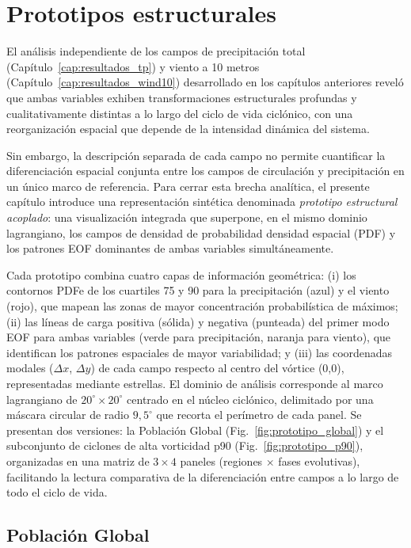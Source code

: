 \chapter{Prototipos estructurales}\label{cap:prototipos}


El análisis independiente de los campos de precipitación total (Capítulo~\ref{cap:resultados_tp}) y viento a 10 metros (Capítulo~\ref{cap:resultados_wind10}) desarrollado en los capítulos anteriores reveló que ambas variables exhiben transformaciones estructurales profundas y cualitativamente distintas a lo largo del ciclo de vida ciclónico, con una reorganización espacial que depende de la intensidad dinámica del sistema.

Sin embargo, la descripción separada de cada campo no permite cuantificar la diferenciación espacial conjunta entre los campos de circulación y precipitación en un único marco de referencia. 
Para cerrar esta brecha analítica, el presente capítulo introduce una representación sintética denominada \textit{prototipo estructural acoplado}: una visualización integrada que superpone, en el mismo dominio lagrangiano, los campos de densidad de probabilidad densidad espacial (PDF) y los patrones EOF dominantes de ambas variables simultáneamente.

Cada prototipo combina cuatro capas de información geométrica: (i) los contornos PDFe de los cuartiles 75 y 90 para la precipitación (azul) y el viento (rojo), que mapean las zonas de mayor concentración probabilística de máximos; (ii) las líneas de carga positiva (sólida) y negativa (punteada) del primer modo EOF para ambas variables (verde para precipitación, naranja para viento), que identifican los patrones espaciales de mayor variabilidad; y (iii) las coordenadas modales ($\Delta x$, $\Delta y$) de cada campo respecto al centro del vórtice (0,0), representadas mediante estrellas. El dominio de análisis corresponde al marco lagrangiano de $20^{\circ} \times 20^{\circ}$ centrado en el núcleo ciclónico, delimitado por una máscara circular de radio $9{,}5^{\circ}$ que recorta el perímetro de cada panel. Se presentan dos versiones: la Población Global (Fig.~\ref{fig:prototipo_global}) y el subconjunto de ciclones de alta vorticidad p90 (Fig.~\ref{fig:prototipo_p90}), organizadas en una matriz de $3 \times 4$ paneles (regiones $\times$ fases evolutivas), facilitando la lectura comparativa de la diferenciación entre campos a lo largo de todo el ciclo de vida.

\section{Población Global}\label{sec:prototipo_global}

